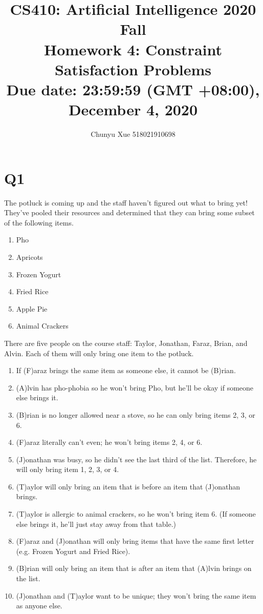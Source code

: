 \documentclass{article}
\title{\normalsize
CS410: Artificial Intelligence 2020 Fall\\
Homework 4: Constraint Satisfaction Problems\\
Due date: 23:59:59 (GMT +08:00), December 4, 2020}
\author{Chunyu Xue 518021910698}
\date{}
\begin{document}
 
\maketitle

\section{Q1}
The potluck is coming up and the staff haven’t figured out what to bring yet! They’ve pooled their resources and determined that they can bring some subset of the following items. 

\begin{enumerate}
    \item Pho
    \item Apricots
    \item Frozen Yogurt
    \item Fried Rice
    \item Apple Pie
    \item Animal Crackers
\end{enumerate}

\noindent There are five people on the course staff: Taylor, Jonathan, Faraz, Brian, and Alvin. Each of them will only bring one item to the potluck.

\begin{enumerate}[i]
  \item If (F)araz brings the same item as someone else, it cannot be (B)rian.
  \item (A)lvin has pho-phobia so he won't bring Pho, but he’ll be okay if someone else brings it.
  \item (B)rian is no longer allowed near a stove, so he can only bring items 2, 3, or 6.
  \item (F)araz literally can’t even; he won’t bring items 2, 4, or 6.
  \item (J)onathan was busy, so he didn’t see the last third of the list. Therefore, he will only bring item 1, 2, 3, or 4.
  \item (T)aylor will only bring an item that is before an item that (J)onathan brings.
  \item (T)aylor is allergic to animal crackers, so he won’t bring item 6. (If someone else brings it, he’ll just stay away from that table.)
  \item (F)araz and (J)onathan will only bring items that have the same first letter (e.g. Frozen Yogurt and Fried Rice).
  \item (B)rian will only bring an item that is after an item that (A)lvin brings on the list.
  \item (J)onathan and (T)aylor want to be unique; they won’t bring the same item as anyone else.
\end{enumerate}
\end{document}

